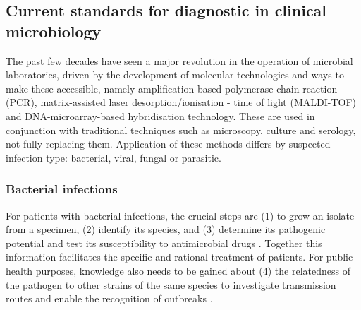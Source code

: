 \subsection{Current standards for diagnostic in clinical microbiology} \label{ssec:current_standards}

The past few decades have seen a major revolution in the operation of microbial laboratories, driven by the development of molecular technologies and ways to make these accessible, namely amplification-based polymerase chain reaction (PCR), matrix-assisted laser desorption/ionisation - time of light (MALDI-TOF) and DNA-microarray-based hybridisation technology. These are used in conjunction with traditional techniques such as microscopy, culture and serology, not fully replacing them. Application of these methods differs by suspected infection type: bacterial, viral, fungal or parasitic.

\subsubsection{Bacterial infections} \label{sssec:bacterial}

For patients with bacterial infections, the crucial steps are (1) to grow an isolate from a specimen, (2) identify its species, and (3) determine its pathogenic potential and test its susceptibility to antimicrobial drugs  \citep{didelot_transforming_2012}. Together this information facilitates the specific and rational treatment of patients. For public health purposes, knowledge also needs to be gained about (4) the relatedness of the pathogen to other strains of the same species to investigate transmission routes and enable the recognition of outbreaks \citep{foxman_choosing_2005}. 

